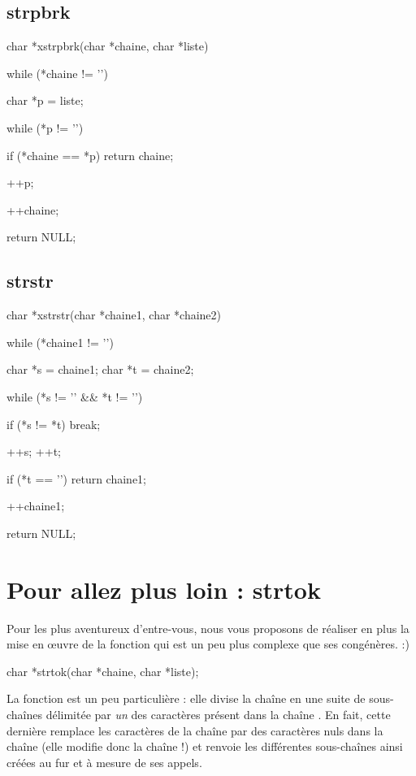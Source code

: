 \subsection{strpbrk}
\label{strpbrk}

\begin{C}
char *xstrpbrk(char *chaine, char *liste)
{
    while (*chaine != '\0')
    {
        char *p = liste;

        while (*p != '\0')
        {
            if (*chaine == *p)
                return chaine;

            ++p;
        }

        ++chaine;
    }

    return NULL;
}
\end{C}

\subsection{strstr}
\label{strstr}

\begin{C}
char *xstrstr(char *chaine1, char *chaine2)
{
    while (*chaine1 != '\0')
    {
        char *s = chaine1;
        char *t = chaine2;

        while (*s != '\0' && *t != '\0')
        {
            if (*s != *t)
                break;
      
            ++s;
            ++t;
        }

        if (*t == '\0')
            return chaine1;

        ++chaine1;
    }

    return NULL;
}
\end{C}

\section{Pour allez plus loin : strtok}
\label{pour-allez-plus-loin-:-strtok}


Pour les plus aventureux d'entre-vous, nous vous
proposons de réaliser en plus la mise en œuvre de la fonction
 qui est un peu plus complexe que ses congénères. :)

\begin{C}
char *strtok(char *chaine, char *liste);
\end{C}

La fonction  est un peu particulière : elle divise la
chaîne  en une suite de sous-chaînes délimitée par
\emph{un} des caractères présent dans la chaîne . En fait,
cette dernière remplace les caractères de la chaîne  par
des caractères nuls dans la chaîne  (elle modifie donc la
chaîne  !) et renvoie les différentes sous-chaînes ainsi
créées au fur et à mesure de ses appels.


